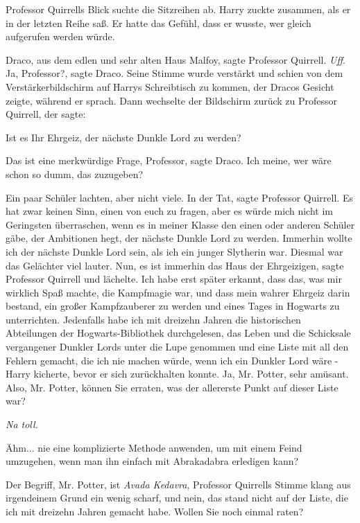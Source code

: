 Professor Quirrells Blick suchte die Sitzreihen ab. Harry zuckte zusammen, als
er in der letzten Reihe saß. Er hatte das Gefühl, dass er wusste, wer gleich
aufgerufen werden würde.

\glqq Draco, aus dem edlen und sehr alten Haus Malfoy\grqq{}, sagte Professor
Quirrell. \emph{Uff}. \glqq Ja, Professor?\grqq{}, sagte Draco. Seine Stimme
wurde verstärkt und schien von dem Verstärkerbildschirm auf Harrys Schreibtisch
zu kommen, der Dracos Gesicht zeigte, während er sprach. Dann wechselte der
Bildschirm zurück zu Professor Quirrell, der sagte:

\glqq Ist es Ihr Ehrgeiz, der nächste Dunkle Lord zu werden?\grqq{}

\glqq Das ist eine merkwürdige Frage, Professor\grqq{}, sagte Draco. \glqq Ich
meine, wer wäre schon so dumm, das zuzugeben?\grqq{}

Ein paar Schüler lachten, aber nicht viele. \glqq In der Tat\grqq{}, sagte
Professor Quirrell. \glqq Es hat zwar keinen Sinn, einen von euch zu fragen,
aber es würde mich nicht im Geringsten überraschen, wenn es in meiner Klasse den
einen oder anderen Schüler gäbe, der Ambitionen hegt, der nächste Dunkle Lord zu
werden. Immerhin wollte ich der nächste Dunkle Lord sein, als ich ein junger
Slytherin war.\grqq{} Diesmal war das Gelächter viel lauter. \glqq Nun, es ist
immerhin das Haus der Ehrgeizigen\grqq{}, sagte Professor Quirrell und lächelte.
\glqq Ich habe erst später erkannt, dass das, was mir wirklich Spaß machte, die
Kampfmagie war, und dass mein wahrer Ehrgeiz darin bestand, ein großer
Kampfzauberer zu werden und eines Tages in Hogwarts zu unterrichten. Jedenfalls
habe ich mit dreizehn Jahren die historischen Abteilungen der
Hogwarts-Bibliothek durchgelesen, das Leben und die Schicksale vergangener
Dunkler Lords unter die Lupe genommen und eine Liste mit all den Fehlern
gemacht, die ich nie machen würde, wenn ich ein Dunkler Lord wäre -\grqq{} Harry
kicherte, bevor er sich zurückhalten konnte. \glqq Ja, Mr. Potter, sehr amüsant.
Also, Mr. Potter, können Sie erraten, was der allererste Punkt auf dieser Liste
war?\grqq{}

\emph{Na toll.}

\glqq Ähm... nie eine komplizierte Methode anwenden, um mit einem Feind
umzugehen, wenn man ihn einfach mit Abrakadabra erledigen kann?\grqq{}

\glqq Der Begriff, Mr. Potter, ist \emph{Avada Kedavra}\grqq{}, Professor
Quirrells Stimme klang aus irgendeinem Grund ein wenig scharf, \glqq und nein,
das stand nicht auf der Liste, die ich mit dreizehn Jahren gemacht habe. Wollen
Sie noch einmal raten?\grqq{}

